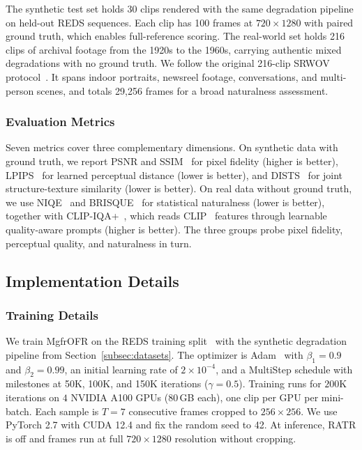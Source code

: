 \documentclass[symmetry,article,submit,pdftex,moreauthors]{Definitions/mdpi}
\begin{document}
The synthetic test set holds 30 clips rendered with the same degradation pipeline on held-out REDS sequences. Each clip has 100 frames at $720 \times 1280$ with paired ground truth, which enables full-reference scoring. The real-world set holds 216 clips of archival footage from the 1920s to the 1960s, carrying authentic mixed degradations with no ground truth. We follow the original 216-clip SRWOV protocol~\cite{mao2025mambaofr}. It spans indoor portraits, newsreel footage, conversations, and multi-person scenes, and totals 29{,}256 frames for a broad naturalness assessment.

\subsubsection{Evaluation Metrics}
\label{subsec:eval_metrics}

Seven metrics cover three complementary dimensions. On synthetic data with ground truth, we report PSNR and SSIM~\cite{wang2004ssim} for pixel fidelity (higher is better), LPIPS~\cite{zhang2018lpips} for learned perceptual distance (lower is better), and DISTS~\cite{ding2020dists} for joint structure-texture similarity (lower is better). On real data without ground truth, we use NIQE~\cite{mittal2012niqe} and BRISQUE~\cite{mittal2012brisque} for statistical naturalness (lower is better), together with CLIP-IQA+~\cite{wang2023clipiqa}, which reads CLIP~\cite{radford2021clip} features through learnable quality-aware prompts (higher is better). The three groups probe pixel fidelity, perceptual quality, and naturalness in turn.

\subsection{Implementation Details}
\label{subsec:implementation}

\subsubsection{Training Details}
\label{subsubsec:training_details}

We train MgfrOFR on the REDS training split~\cite{nah2019reds} with the synthetic degradation pipeline from Section~\ref{subsec:datasets}. The optimizer is Adam~\cite{kingma2015adam} with $\beta_1=0.9$ and $\beta_2=0.99$, an initial learning rate of $2\times10^{-4}$, and a MultiStep schedule with milestones at 50K, 100K, and 150K iterations ($\gamma=0.5$). Training runs for $200$K iterations on $4$ NVIDIA A100 GPUs (80\,GB each), one clip per GPU per mini-batch. Each sample is $T=7$ consecutive frames cropped to $256\times256$. We use PyTorch 2.7 with CUDA 12.4 and fix the random seed to 42. At inference, RATR is off and frames run at full $720 \times 1280$ resolution without cropping.
\end{document}
